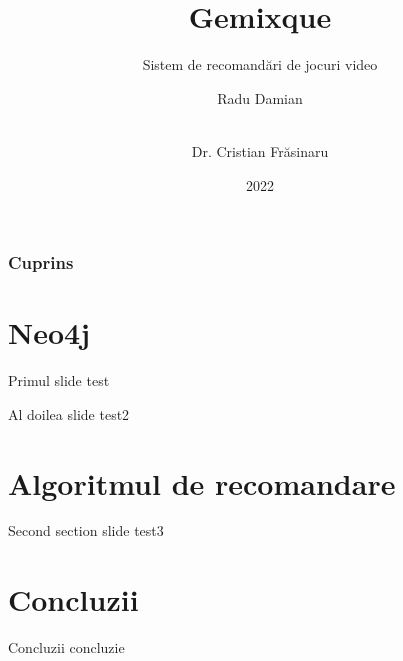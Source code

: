 \documentclass{beamer}
\title[Gemixque - sistem de recomandări de jocuri video]{Gemixque}
\subtitle{Sistem de recomandări de jocuri video}
\author[Radu Damian]{Radu Damian \and \\[9mm] Dr. Cristian Frăsinaru}
\institute{Facultatea de Informatică}
\date{2022}
\begin{document}
\frame{\titlepage}


\begin{frame}
  \frametitle{Cuprins}
  \tableofcontents
\end{frame}

\section{Neo4j}
\frame{\tableofcontents[currentsection]}
\begin{frame}{Primul slide}
    test
\end{frame}

\begin{frame}{Al doilea slide}
    test2
\end{frame}

\section{Algoritmul de recomandare}
\frame{\tableofcontents[currentsection]}
\begin{frame}{Second section slide}
    test3
\end{frame}

\section{Concluzii}
\frame{\tableofcontents[currentsection]}
\begin{frame}{Concluzii}
	concluzie
\end{frame}
\end{document}
